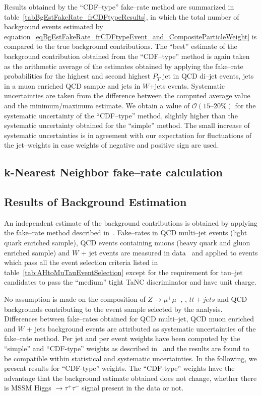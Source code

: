 Results obtained by the ``CDF--type'' fake--rate method are summarized in
table~\ref{tabBgEstFakeRate_frCDFtypeResults}, in which the total number of
background events estimated by
equation~\ref{eqBgEstFakeRate_frCDFtypeEvent_and_CompositeParticleWeight} is
compared to the true background contributions.  The ``best'' estimate of the
background contribution obtained from the ``CDF--type'' method is again taken as
the arithmetic average of the estimates obtained by applying the fake--rate
probabilities for the highest and second highest $P_{T}$ jet in QCD di--jet
events, jets in a muon enriched QCD sample and jets in $W$+jets events.
Systematic uncertainties are taken from the difference between the computed
average value and the minimum/maximum estimate.  We obtain a value of
$\mathcal{O} \left( 15 \mbox{--} 20 \% \right)$ for the systematic uncertainty
of the ``CDF--type'' method, slightly higher than the systematic uncertainty
obtained for the ``simple'' method.  The small increase of systematic
uncertainties is in agreement with our expectation for fluctuations of the
jet--weights in case weights of negative and positive sign are used.

\subsection{k-Nearest Neighbor fake--rate calculation}

\subsection{Results of Background Estimation}

An independent estimate of the background contributions is obtained by applying
the fake--rate method described in~\cite{CMS_AN_2010-074}.  Fake--rates in QCD
multi--jet events (light quark enriched sample), QCD events containing muons
(heavy quark and gluon enriched sample) and $W$ + jet events are measured in
data~\cite{PFT-10-004,CMS_AN_2010-XXX} and applied to events which pass all the
event selection criteria listed in table~\ref{tab:AHtoMuTauEventSelection}
except for the requirement for tau--jet candidates to pass the ``medium'' tight
TaNC discriminator and have unit charge.

No assumption is made on the composition of $Z \to \mu^{+} \mu^{-}$, \WpJets,
$t\bar{t} + jets$ and QCD backgrounds contributing to the event sample selected
by the analysis.  Differences between fake--rates obtained for QCD multi--jet,
QCD muon enriched and $W$ + jets background events are attributed as systematic
uncertainties of the fake--rate method.  Per jet and per event weights have been
computed by the ``simple'' and ``CDF-type'' weights as described
in~\cite{CMS_AN_2010-074} and the results are found to be compatible within
statistical and systematic uncertainties.  In the following, we present results
for ``CDF-type'' weights.  The ``CDF-type'' weights have the advantage that the
background estimate obtained does not change, whether there is MSSM Higgs $\to
\tau^{+} \tau^{-}$ signal present in the data or not.

